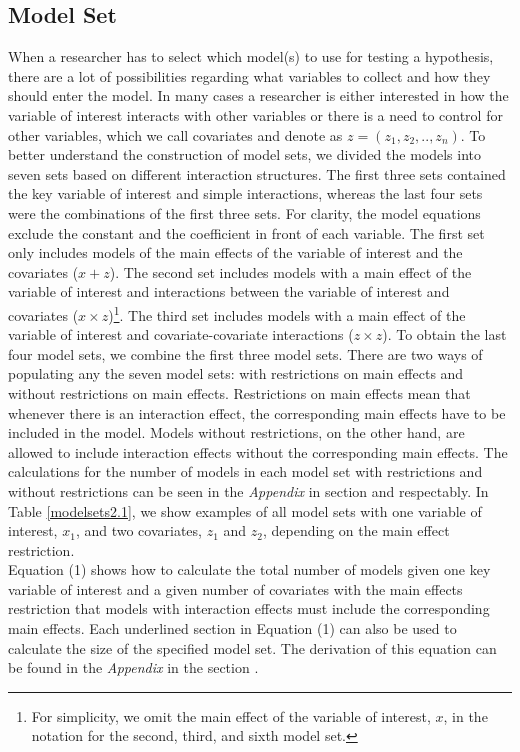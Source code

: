 \subsection{Model Set}
When a researcher has to select which model(s) to use for testing a hypothesis, there are a lot of possibilities regarding what variables to collect and how they should enter the model. In many cases a researcher is either interested in how the variable of interest interacts with other variables or there is a need to control for other variables, which we call covariates and denote as $z=(z_1,z_2,..,z_n)$. 
To better understand the construction of model sets, we divided the models into seven sets based on different interaction structures. The first three sets contained the key variable of interest and simple interactions, whereas the last four sets were the combinations of the first three sets. For clarity, the model equations exclude the constant and the coefficient in front of each variable. The first set only includes models of the main effects of the variable of interest and the covariates ($x + z$). The second set includes models with a main effect of the variable of interest and interactions between the variable of interest and covariates ($x \times z$)\footnote{For simplicity, we omit the main effect of the variable of interest, $x$, in the notation for the second, third, and sixth model set.}. The third set includes models with a main effect of the variable of interest and covariate-covariate interactions ($z \times z$).
To obtain the last four model sets, we combine the first three model sets. There are two ways of populating any the seven model sets: with restrictions on main effects and without restrictions on main effects. Restrictions on main effects mean that whenever there is an interaction effect, the corresponding main effects have to be included in the model. Models without restrictions, on the other hand, are allowed to include interaction effects without the corresponding main effects. The calculations for the number of models in each model set with restrictions and without restrictions can be seen in the \textit{Appendix} in section  and  respectably. In Table \ref{modelsets2.1}, we show examples of all model sets with one variable of interest, $x_{1}$, and two covariates, $z_{1}$ and $z_{2}$, depending on the main effect restriction. \\
 


Equation (1) shows how to calculate the total number of models given one key variable of interest and a given number of covariates with the main effects restriction that models with interaction effects must include the corresponding main effects. Each underlined section in Equation (1) can also be used to calculate the size of the specified model set. The derivation of this equation can be found in the \textit{Appendix} in the section . \\

